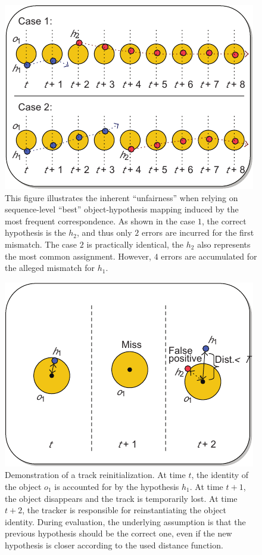 \begin{figure}[t]
    \centerline{\includegraphics[width=0.5\linewidth]{figures/theoretical_foundations/seq_based_correspondence_issues.pdf}}
    \caption[Sequence-based correspondence mismatches]{This figure illustrates the inherent ``unfairness'' when relying on sequence-level ``best'' object-hypothesis mapping induced by the most frequent correspondence. As shown in the case $1$, the correct hypothesis is the $h_2$, and thus only $2$ errors are incurred for the first mismatch. The case $2$ is practically identical, the $h_2$ also represents the most common assignment. However, $4$ errors are accumulated for the alleged mismatch for $h_1$. }
    \label{fig:SeqLevelMostCommonCorrespondenceProb}
\end{figure}

\begin{figure}[t]
    \centerline{\includegraphics[width=0.5\linewidth]{figures/theoretical_foundations/object_hypothesis_reinit.pdf}}
    \caption[Object-hypothesis re-initialization]{Demonstration of a track reinitialization. At time $t$, the identity of the object $o_1$ is accounted for by the hypothesis $h_1$. At time $t + 1$, the object disappears and the track is temporarily lost. At time $t + 2$, the tracker is responsible for reinstantiating the object identity. During evaluation, the underlying assumption is that the previous hypothesis should be the correct one, even if the new hypothesis is closer according to the used distance function. }
    \label{fig:ObjectHypothesisReInit}
\end{figure}

